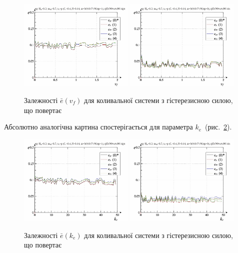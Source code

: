 \begin{figure}[ht!]
\begin{center}
  \includegraphics[width=0.49\textwidth]{p/cha/vg/vg_id-p_v_f_sign.png}
  \hfill
  \includegraphics[width=0.49\textwidth]{p/cha/vg/vg_id-p_v_f_sin.png}
\end{center}
  \caption{Залежності $\bar{e}(v_f)$ для коливальної системи з гістерезисною силою, що повертає}
\label{atu:f:vg_e_v_f}
\end{figure}

Абсолютно аналогічна картина спостерігається для параметра
$ k_e $~(рис.~\ref{atu:f:vg_e_k_e}).

\begin{figure}[ht!]
\begin{center}
  \includegraphics[width=0.49\textwidth]{p/cha/vg/vg_id-p_k_e_sign.png}
  \hfill
  \includegraphics[width=0.49\textwidth]{p/cha/vg/vg_id-p_k_e_sin.png}
\end{center}
  \caption{Залежності $\bar{e}(k_e)$ для коливальної системи з гістерезисною силою, що повертає}
\label{atu:f:vg_e_k_e}
\end{figure}

